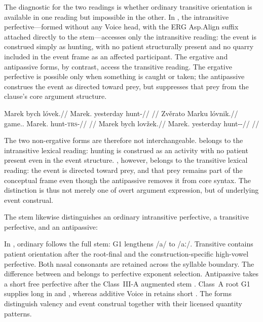 The diagnostic for the two readings is whether ordinary transitive orientation 
is available in one reading but impossible in the other. In , the
intransitive perfective---formed without any Voice head, with the ERG Asp.Align
suffix attached directly to the stem---accesses only the intransitive reading:
the event is construed simply as hunting, with no patient structurally present
and no quarry included in the event frame as an affected participant. The
ergative and antipassive forms, by contrast, access the transitive reading. The
ergative perfective  is possible only when something is caught or
taken; the antipassive construes the event as directed toward prey, but
suppresses that prey from the clause's core argument structure.

\pex
\a
\begingl
\gla Marek bych lóvek.//
\glb Marek.\Dir{} yesterday hunt-\Pf{}//
\glft {} //
\endgl
\a
\begingl
\gla Zvěrato Marku lóvnik.//
\glb game.\Dir{}.\Def{} Marek.\Trs{} hunt-\textsc{trs}-\Pf{}//
\glft {} //
\endgl
\a
\begingl
\gla Marek bych lovžek.//
\glb Marek.\Dir{} yesterday hunt-\Antip{}-\Pf{}//
\glft {} //
\endgl
\xe

The two non-ergative forms are therefore not interchangeable. 
belongs to the intransitive lexical reading: hunting is construed as an activity
with no patient present even in the event structure. , however,
belongs to the transitive lexical reading: the event is directed toward prey,
and that prey remains part of the conceptual frame even though the antipassive
removes it from core syntax. The distinction is thus not merely one of overt
argument expression, but of underlying event construal.

The stem  likewise distinguishes an ordinary intransitive perfective,
a transitive perfective, and an antipassive:

\pex
\a {} 
\a {} 
\a {} 
\xe

In , ordinary  follows the full stem: G1 lengthens
/a/ to /aː/. Transitive  contains patient orientation
 after the root-final  and the construction-specific
high-vowel perfective. Both nasal consonants are retained across the
syllable boundary. The difference between  and  belongs to
perfective exponent selection. Antipassive  takes a short
free perfective after the Class~III-A augmented stem .
Class~A root G1 supplies long  in  and ,
whereas additive Voice in  retains short .
The forms distinguish valency and event construal together with their
licensed quantity patterns.


